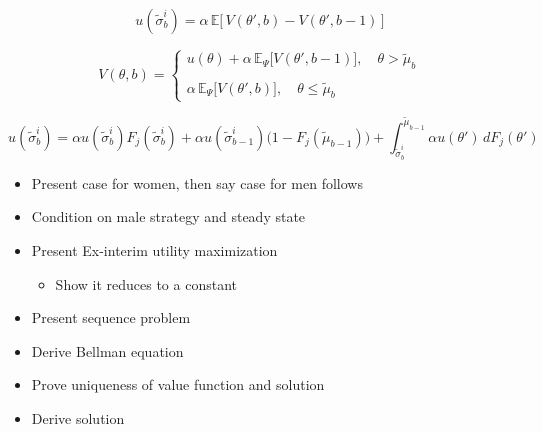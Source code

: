 \begin{equation}
    u(\widetilde\sigma^i_b) = \alpha \, \mathbb{E}\Big[\,V(\theta',b)-V(\theta',b-1)\,\Big]  
\end{equation}

\begin{equation}
    V(\theta, b)=\begin{cases} 
        u(\theta) +\alpha \,\mathbb{E}_{\Psi}\Big[V(\theta', b-1)\Big],\quad \theta> \widetilde \mu_b \\\\ 
        \alpha \,\mathbb{E}_{\Psi}\Big[V(\theta', b)\Big],\quad \theta\leq\widetilde \mu_b
    \end{cases}  
\end{equation}

\begin{equation}
    u(\widetilde \sigma^i_b) = \alpha u(\widetilde \sigma^i_b) F_j(\widetilde \sigma^i_b) + \alpha u(\widetilde \sigma^i_{b-1})\Big(1- F_j(\widetilde \mu_{b-1})\Big)+\int^{\widetilde \mu_{b-1}}_{\widetilde \sigma^i_b} \alpha u(\theta')\,dF_j(\theta')
\end{equation} 


\begin{itemize}
    \item Present case for women, then say case for men follows
    \item Condition on male strategy and steady state
    \item Present Ex-interim utility maximization
    \begin{itemize}
        \item Show it reduces to a constant
    \end{itemize} 
    \item Present sequence problem
    \item Derive Bellman equation
    \item Prove uniqueness of value function and solution
    \item Derive solution
\end{itemize}